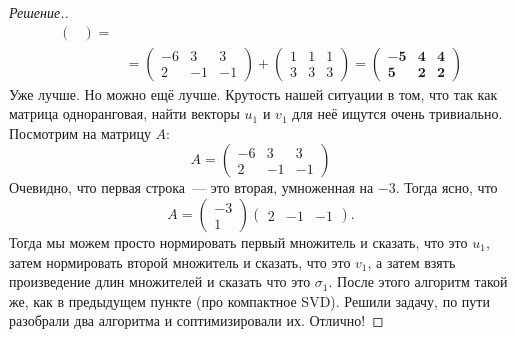 \documentclass[a4paper]{article}
\theoremstyle{remark}
\begin{document}
\begin{proof}[Решение.]
\begin{align*}
\begin{pmatrix}
            \end{pmatrix} = \\
            &= \begin{pmatrix}
              -6 & 3 & 3 \\
              2 & -1 & -1
            \end{pmatrix} + \begin{pmatrix}
              1 & 1 & 1 \\
              3 & 3  & 3
            \end{pmatrix} = \begin{pmatrix}
              \bm{-5} & \bm{4} & \bm{4} \\
              \bm{5} & \bm{2} & \bm{2}
            \end{pmatrix}
          \end{align*}
          Уже лучше. Но можно ещё лучше. Крутость нашей ситуации в том, что так как матрица одноранговая, найти векторы $u_1$ и $v_1$ для неё ищутся очень тривиально. Посмотрим на матрицу $A$:
          \begin{equation*}
            A = \begin{pmatrix}
              -6 & 3 & 3 \\
              2 & -1 & -1
            \end{pmatrix}
          \end{equation*}
          Очевидно, что первая строка~--- это вторая, умноженная на $-3$. Тогда ясно, что 
          \begin{equation*}
            A = \begin{pmatrix}
              -3 \\
              1
            \end{pmatrix} \begin{pmatrix}
              2 & -1 & -1
            \end{pmatrix}.
          \end{equation*}
          Тогда мы можем просто нормировать первый множитель и сказать, что это $u_1$, затем нормировать второй множитель и сказать, что это $v_1$, а затем взять произведение длин множителей и сказать что это $\sigma_1$. После этого алгоритм такой же, как в предыдущем пункте (про компактное SVD). Решили задачу, по пути разобрали два алгоритма и соптимизировали их. Отлично!
        \end{proof}

\end{document}
